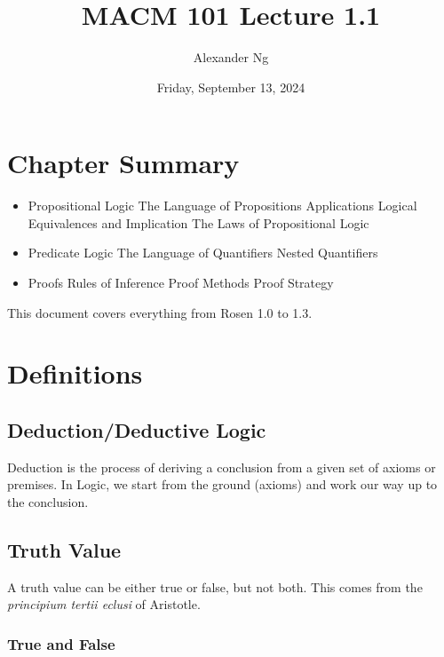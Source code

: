 \documentclass[12pt]{article}
\begin{document}
\title{MACM 101 Lecture 1.1}
\author{Alexander Ng}
\date{Friday, September 13, 2024}

\maketitle

\section{Chapter Summary}

\begin{itemize}
  \item Propositional Logic
    \subitem The Language of Propositions
    \subitem Applications
    \subitem Logical Equivalences and Implication
    \subitem The Laws of Propositional Logic

  \item Predicate Logic
    \subitem The Language of Quantifiers
    \subitem Nested Quantifiers

  \item Proofs
    \subitem Rules of Inference
    \subitem Proof Methods
    \subitem Proof Strategy
\end{itemize}

This document covers everything from Rosen 1.0 to 1.3.

\section{Definitions}


\subsection{Deduction/Deductive Logic}

Deduction is the process of deriving a conclusion from a given set of axioms 
or premises. In Logic, we start from the ground (axioms) and work our way up to
the conclusion.

\subsection{Truth Value}

A truth value can be either true or false, but not both. This comes from the
\textit{principium tertii eclusi} of Aristotle.

\subsubsection{True and False}
\end{document}
